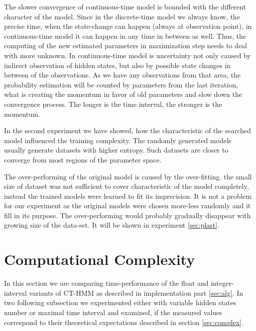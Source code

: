 \documentclass[thesis=M,english]{FITthesis}[2012/10/20]
\begin{document}
The slower convergence of continuous-time model is bounded with the different character of the model. Since in the discrete-time model we always know, the precise time, when the state-change can happen (always at observation point), in continuous-time model it can happen in any time in between as well. Thus, the computing of the new estimated parameters in maximization step needs to deal with more unknown. 
In continuous-time model is uncertainty not only caused by indirect observation of hidden states, but also by possible state changes in between of the observations. As we have any observations from that area, the probability estimation will be counted by parameters from the last iteration, what is creating the momentum in favor of old parameters and slow down the convergence process. The longer is the time interval, the stronger is the momentum.

In the second experiment we have showed, how the characteristic of the searched model influenced the training complexity. The randomly generated models usually generate datasets with higher entropy. Such datasets are closer to converge from most regions of the parameter space. 

The over-performing of the original model is caused by the over-fitting. the small size of dataset was not sufficient to cover characteristic of the model completely, instead the trained models were learned to fit its imprecision. It is not a problem for our experiment as the original models were chosen more-less randomly and it fill in its purpose. The over-performing would probably gradually disappear with growing size of the data-set. It will be shown in experiment \ref{sec:plast}.

 	


\section{Computational Complexity}\label{sec:cc}

In this section we are comparing time-performance of the float and integer-interval variants of CT-HMM  as described in implementation part \ref{sec:alg}.
In two following subsection we experimented either with  variable hidden states number or maximal time interval and examined, if the measured values correspond to their theoretical expectations described in section \ref{sec:complex}.
\end{document}
